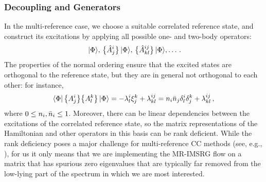 \subsubsection{Decoupling and Generators}
In the multi-reference case, we choose a suitable correlated reference 
state, and construct its excitations by applying all possible one- 
and two-body operators:
\begin{equation}
  \,|{\Phi}\rangle,\,\big\{\hat{A}^{i}_{j}\big\}\,|{\Phi}\rangle,\,\big\{\hat{A}^{ij}_{kl}\big\}\,|{\Phi}\rangle,\ldots\,.
\end{equation}
The properties of the normal ordering ensure that the excited states are
orthogonal to the reference state, but they are in general not orthogonal 
to each other: for instance,
\begin{equation}
  \langle{\Phi}|\,{\big\{A^{i}_{j}\big\}\big\{A^{k}_{l}\big\}}\,|{\Phi}\rangle
  =-\lambda^{i}_{l}\xi^{k}_{j} + \lambda^{ij}_{kl}
  =n_i\bar{n}_j \delta^{i}_{l}\delta^{k}_{j} + \lambda^{ij}_{kl}\,,
\end{equation}
where $0\leq n_i, \bar{n}_i \leq 1$. Moreover, there can be linear dependencies
between the excitations of the correlated reference state, so the matrix
representations of the Hamiltonian and other operators in this basis can 
be rank deficient. While the rank deficiency poses a major challenge for 
multi-reference CC methods (see, e.g., \cite{Lyakh:2012zr}), for us it only
means that we are implementing the MR-IMSRG flow on a matrix that has
spurious zero eigenvalues that are typically far removed from the low-lying
part of the spectrum in which we are most interested.

